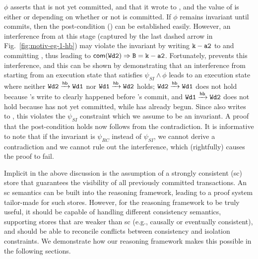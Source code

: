 \noindent $\phi$ asserts that  is not yet committed, and that
it wrote to , and the value of  is either  or
 depending on whether or not  is committed. If $\phi$
remains invariant until  commits, then the post-condition () can be established easily. However, an interference from
 at this stage (captured by the last dashed arrow in
Fig.~\ref{fig:motiv-eg-1-hb}) may violate the invariant by writing
${\tt k-a2}$ to  and committing , thus leading to
$\textsf{com}({\tt Wd2}) \Rightarrow {\tt B=k-a2}$. Fortunately,
 prevents this interference, and this can be
shown by demonstrating that an interference from  starting from
an execution state that satisfies $\psi_{SI} \wedge \phi$ leads to an
execution state where neither ${\tt Wd2} \xrightarrow{\textsf{hb}} {\tt Wd1}$ nor ${\tt Wd1}
\xrightarrow{\textsf{hb}} {\tt Wd2}$ holds; ${\tt Wd2} \xrightarrow{\textsf{hb}} {\tt Wd1}$ does not hold because
's write to  clearly happened before 's commit, and
${\tt Wd1} \xrightarrow{\textsf{hb}} {\tt Wd2}$ does not hold because  has not yet
committed, while  has already begun. Since  also writes
to , this violates the $\psi_{SI}$ constraint which we assume to
be an invariant. A proof that the post-condition holds now follows
from the contradiction. It is informative to note that if the
invariant is $\psi_{RC}$ instead of $\psi_{SI}$, we cannot derive a
contradiction and we cannot rule out the interference, which
(rightfully) causes  the proof to fail.

Implicit in the above discussion is the assumption of a strongly
consistent ({\sc sc}) store that guarantees the visibility of all
previously committed transactions. An {\sc sc} semantics can be built
into the reasoning framework, leading to a proof system tailor-made
for such stores.  However, for the reasoning framework to be truly
useful, it should be capable of handling different consistency
semantics, supporting stores that are weaker than {\sc sc} (e.g.,
causally or eventually consistent), and should be able to reconcile
conflicts between consistency and isolation constraints.  We
demonstrate how our reasoning framework makes this possible in the
following sections.

